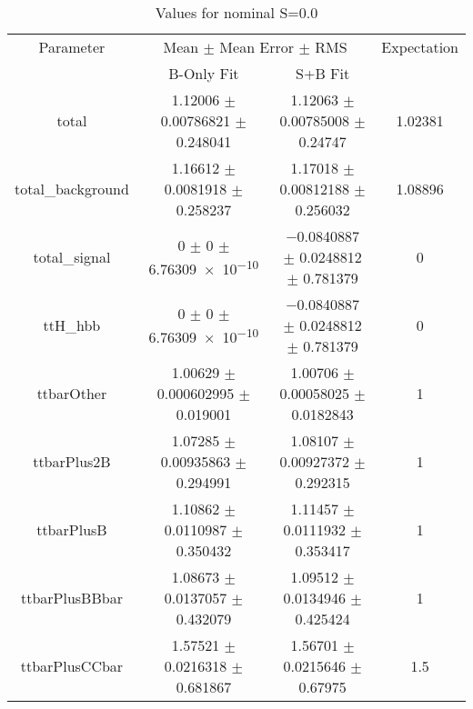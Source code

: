 \begin{table}
\centering
\caption{Values for nominal S=0.0}
\begin{tabular}{cccc}
\toprule
Parameter & \multicolumn{2}{c}{Mean $\pm$ Mean Error $\pm$ RMS} & Expectation\\
 & B-Only Fit & S+B Fit & \\
\midrule
total & \num{1.12006} $\pm$ \num{0.00786821} $\pm$ \num{0.248041} & \num{1.12063} $\pm$ \num{0.00785008} $\pm$ \num{0.24747} & \num{1.02381}\\
total\_background & \num{1.16612} $\pm$ \num{0.0081918} $\pm$ \num{0.258237} & \num{1.17018} $\pm$ \num{0.00812188} $\pm$ \num{0.256032} & \num{1.08896}\\
total\_signal & \num{0} $\pm$ \num{0} $\pm$ \num{6.76309e-10} & \num{-0.0840887} $\pm$ \num{0.0248812} $\pm$ \num{0.781379} & \num{0}\\
ttH\_hbb & \num{0} $\pm$ \num{0} $\pm$ \num{6.76309e-10} & \num{-0.0840887} $\pm$ \num{0.0248812} $\pm$ \num{0.781379} & \num{0}\\
ttbarOther & \num{1.00629} $\pm$ \num{0.000602995} $\pm$ \num{0.019001} & \num{1.00706} $\pm$ \num{0.00058025} $\pm$ \num{0.0182843} & \num{1}\\
ttbarPlus2B & \num{1.07285} $\pm$ \num{0.00935863} $\pm$ \num{0.294991} & \num{1.08107} $\pm$ \num{0.00927372} $\pm$ \num{0.292315} & \num{1}\\
ttbarPlusB & \num{1.10862} $\pm$ \num{0.0110987} $\pm$ \num{0.350432} & \num{1.11457} $\pm$ \num{0.0111932} $\pm$ \num{0.353417} & \num{1}\\
ttbarPlusBBbar & \num{1.08673} $\pm$ \num{0.0137057} $\pm$ \num{0.432079} & \num{1.09512} $\pm$ \num{0.0134946} $\pm$ \num{0.425424} & \num{1}\\
ttbarPlusCCbar & \num{1.57521} $\pm$ \num{0.0216318} $\pm$ \num{0.681867} & \num{1.56701} $\pm$ \num{0.0215646} $\pm$ \num{0.67975} & \num{1.5}\\
\bottomrule
\end{tabular}
\end{table}